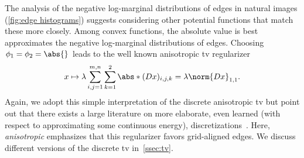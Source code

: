 \begin{sidefigure}
	\centering
	\caption[Sparsity of edges in natural images]{%
		Sum of the absolute horizontal and vertical difference of neighboring pixels (bottom right) of an \gls{mri} image from the fastMRI~\cite{zbontar_fastmri_2018} dataset (top left).
	}%
	\label{fig:gradient sparsity of natural images}
\end{sidefigure}

The analysis of the negative log-marginal distributions of edges in natural images (\cref{fig:edge histograms}) suggests considering other potential functions that match these more closely.
Among convex functions, the absolute value is best approximates the negative log-marginal distributions of edges.
Choosing \( \Potential_{\num{1}} = \Potential_{\num{2}} = \abs{} \) leads to the well known anisotropic \gls{tv} regularizer
\begin{equation}
	x \mapsto \lambda \sum_{i,j=\num{1}}^{m,n} \sum_{k=\num{1}}^{\num{2}} \abs*{(\DiffOp x)_{i,j,k}} = \lambda \norm{Dx}_{\num{1}, \num{1}}.
	\label{eq:absolute gradient penalization}
\end{equation}
Again, we adopt this simple interpretation of the discrete anisotropic \gls{tv} but point out that there exists a large literature on more elaborate, even learned (with respect to approximating some continuous energy), discretizations~\cite{bogensperger_learned_2023,chambolle_learning_2021,condat_tv_2017}.
Here, \emph{anisotropic} emphasizes that this regularizer favors grid-aligned edges.
We discuss different versions of the discrete \gls{tv} in~\cref{ssec:tv}.

